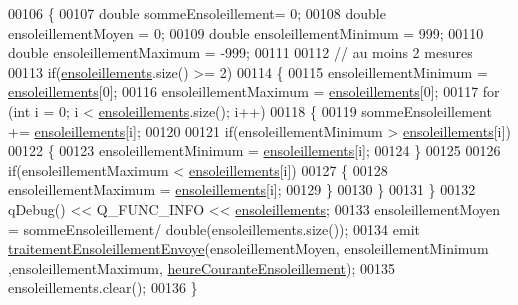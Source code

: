 \begin{DoxyCode}
00106 \{
00107     \textcolor{keywordtype}{double} sommeEnsoleillement= 0;
00108     \textcolor{keywordtype}{double} ensoleillementMoyen = 0;
00109     \textcolor{keywordtype}{double} ensoleillementMinimum = 999;
00110     \textcolor{keywordtype}{double} ensoleillementMaximum = -999;
00111 
00112     \textcolor{comment}{// au moins 2 mesures}
00113     \textcolor{keywordflow}{if}(\hyperlink{class_infos_ensoleillement_a6c3640ed7f3169e6263dc04b0191f478}{ensoleillements}.size() >= 2)
00114     \{
00115         ensoleillementMinimum = \hyperlink{class_infos_ensoleillement_a6c3640ed7f3169e6263dc04b0191f478}{ensoleillements}[0];
00116         ensoleillementMaximum = \hyperlink{class_infos_ensoleillement_a6c3640ed7f3169e6263dc04b0191f478}{ensoleillements}[0];
00117         \textcolor{keywordflow}{for} (\textcolor{keywordtype}{int} i = 0; i < \hyperlink{class_infos_ensoleillement_a6c3640ed7f3169e6263dc04b0191f478}{ensoleillements}.size(); i++)
00118         \{
00119             sommeEnsoleillement += \hyperlink{class_infos_ensoleillement_a6c3640ed7f3169e6263dc04b0191f478}{ensoleillements}[i];
00120 
00121             \textcolor{keywordflow}{if}(ensoleillementMinimum > \hyperlink{class_infos_ensoleillement_a6c3640ed7f3169e6263dc04b0191f478}{ensoleillements}[i])
00122             \{
00123                 ensoleillementMinimum = \hyperlink{class_infos_ensoleillement_a6c3640ed7f3169e6263dc04b0191f478}{ensoleillements}[i];
00124             \}
00125 
00126             \textcolor{keywordflow}{if}(ensoleillementMaximum < \hyperlink{class_infos_ensoleillement_a6c3640ed7f3169e6263dc04b0191f478}{ensoleillements}[i])
00127             \{
00128                 ensoleillementMaximum = \hyperlink{class_infos_ensoleillement_a6c3640ed7f3169e6263dc04b0191f478}{ensoleillements}[i];
00129             \}
00130         \}
00131     \}
00132     qDebug() << Q\_FUNC\_INFO << \hyperlink{class_infos_ensoleillement_a6c3640ed7f3169e6263dc04b0191f478}{ensoleillements};
00133     ensoleillementMoyen = sommeEnsoleillement/ double(ensoleillements.size());
00134     emit \hyperlink{class_infos_ensoleillement_a8c0f6c50648ffc4f47f049727e05e8d0}{traitementEnsoleillementEnvoye}(ensoleillementMoyen, 
      ensoleillementMinimum ,ensoleillementMaximum, \hyperlink{class_infos_ensoleillement_adbf40d147f8a7dbcf5f71b1ac4e0933d}{heureCouranteEnsoleillement});
00135     ensoleillements.clear();
00136 \}
\end{DoxyCode}
\mbox{\label{class_infos_ensoleillement_ac89935ebb118ba2d28504d7341f67a7f}} 
